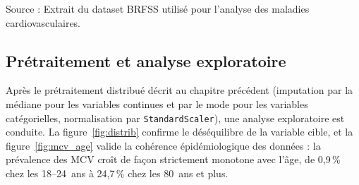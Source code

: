 \documentclass[12pt,a4paper]{report}
\begin{document}
\begin{table}[H]
\centering
\caption{Présentation d’un extrait du dataset BRFSS 2020--2024}
\label{tab:kaggle_dataset}

\renewcommand{\arraystretch}{1.2}


\vspace{0.3cm}

\small
Source : Extrait du dataset BRFSS utilisé pour l’analyse des maladies cardiovasculaires.

\end{table}

\subsection{Prétraitement et analyse exploratoire}

Après le prétraitement distribué décrit au chapitre précédent (imputation par la
médiane pour les variables continues et par le mode pour les variables
catégorielles, normalisation par \texttt{StandardScaler}), une analyse exploratoire
est conduite. La figure~\ref{fig:distrib} confirme le déséquilibre de la variable
cible, et la figure~\ref{fig:mcv_age} valide la cohérence épidémiologique des
données : la prévalence des \acs{MCV} croît de façon strictement monotone avec
l'âge, de 0,9\,\% chez les 18--24~ans à 24,7\,\% chez les 80~ans et plus.
\end{document}
